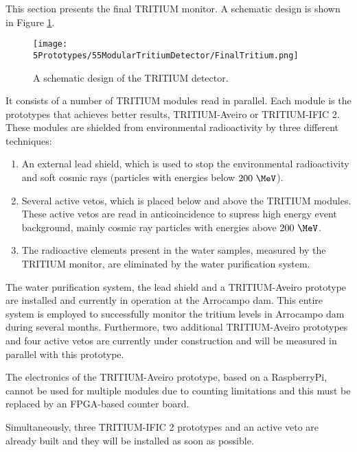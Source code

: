 This section presents the final TRITIUM monitor. A schematic design is shown in Figure \ref{fig:TritiumDetectorSchematicDesign}.

\begin{figure}[h]
\centering
\texttt{[image: 5Prototypes/55ModularTritiumDetector/FinalTritium.png]}
\caption{A schematic design of the TRITIUM detector.\label{fig:TritiumDetectorSchematicDesign}}
\end{figure}

It consists of a number of TRITIUM modules read in parallel. Each module is the prototypes that achieves better results, TRITIUM-Aveiro or TRITIUM-IFIC 2. These modules are shielded from environmental radioactivity by three different techniques:

\begin{enumerate}

\item{} An external lead shield, which is used to stop the environmental radioactivity and soft cosmic rays (particles with energies below $200~\MeV$).

\item{} Several active vetos, which is placed below and above the TRITIUM modules. These active vetos are read in anticoincidence to supress high energy event background, mainly cosmic ray particles with energies above $200~\MeV$.

\item{} The radioactive elements present in the water samples, measured by the TRITIUM monitor, are eliminated by the water purification system.

\end{enumerate}

The water purification system, the lead shield and a TRITIUM-Aveiro prototype are installed and currently in operation at the Arrocampo dam. This entire system is employed to successfully monitor the tritium levels in Arrocampo dam during several months. Furthermore, two additional TRITIUM-Aveiro prototypes and four active vetos are currently under construction and will be measured in parallel with this prototype.

The electronics of the TRITIUM-Aveiro prototype, based on a RaspberryPi, cannot be used for multiple modules due to counting limitations and this must be replaced by an FPGA-based counter board.

Simultaneously, three TRITIUM-IFIC 2 prototypes and an active veto are already built and they will be installed as soon as possible.

